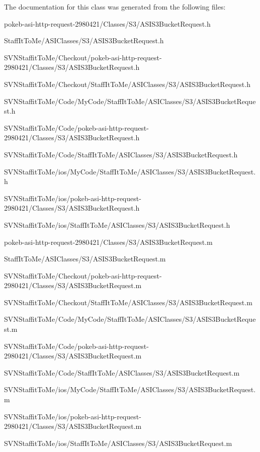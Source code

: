 \-The documentation for this class was generated from the following files\-:\begin{DoxyCompactItemize}
\item 
pokeb-\/asi-\/http-\/request-\/2980421/\-Classes/\-S3/\-A\-S\-I\-S3\-Bucket\-Request.\-h\item 
\-Staff\-It\-To\-Me/\-A\-S\-I\-Classes/\-S3/\-A\-S\-I\-S3\-Bucket\-Request.\-h\item 
\-S\-V\-N\-Staffit\-To\-Me/\-Checkout/pokeb-\/asi-\/http-\/request-\/2980421/\-Classes/\-S3/\-A\-S\-I\-S3\-Bucket\-Request.\-h\item 
\-S\-V\-N\-Staffit\-To\-Me/\-Checkout/\-Staff\-It\-To\-Me/\-A\-S\-I\-Classes/\-S3/\-A\-S\-I\-S3\-Bucket\-Request.\-h\item 
\-S\-V\-N\-Staffit\-To\-Me/\-Code/\-My\-Code/\-Staff\-It\-To\-Me/\-A\-S\-I\-Classes/\-S3/\-A\-S\-I\-S3\-Bucket\-Request.\-h\item 
\-S\-V\-N\-Staffit\-To\-Me/\-Code/pokeb-\/asi-\/http-\/request-\/2980421/\-Classes/\-S3/\-A\-S\-I\-S3\-Bucket\-Request.\-h\item 
\-S\-V\-N\-Staffit\-To\-Me/\-Code/\-Staff\-It\-To\-Me/\-A\-S\-I\-Classes/\-S3/\-A\-S\-I\-S3\-Bucket\-Request.\-h\item 
\-S\-V\-N\-Staffit\-To\-Me/ios/\-My\-Code/\-Staff\-It\-To\-Me/\-A\-S\-I\-Classes/\-S3/\-A\-S\-I\-S3\-Bucket\-Request.\-h\item 
\-S\-V\-N\-Staffit\-To\-Me/ios/pokeb-\/asi-\/http-\/request-\/2980421/\-Classes/\-S3/\-A\-S\-I\-S3\-Bucket\-Request.\-h\item 
\-S\-V\-N\-Staffit\-To\-Me/ios/\-Staff\-It\-To\-Me/\-A\-S\-I\-Classes/\-S3/\-A\-S\-I\-S3\-Bucket\-Request.\-h\item 
pokeb-\/asi-\/http-\/request-\/2980421/\-Classes/\-S3/\-A\-S\-I\-S3\-Bucket\-Request.\-m\item 
\-Staff\-It\-To\-Me/\-A\-S\-I\-Classes/\-S3/\-A\-S\-I\-S3\-Bucket\-Request.\-m\item 
\-S\-V\-N\-Staffit\-To\-Me/\-Checkout/pokeb-\/asi-\/http-\/request-\/2980421/\-Classes/\-S3/\-A\-S\-I\-S3\-Bucket\-Request.\-m\item 
\-S\-V\-N\-Staffit\-To\-Me/\-Checkout/\-Staff\-It\-To\-Me/\-A\-S\-I\-Classes/\-S3/\-A\-S\-I\-S3\-Bucket\-Request.\-m\item 
\-S\-V\-N\-Staffit\-To\-Me/\-Code/\-My\-Code/\-Staff\-It\-To\-Me/\-A\-S\-I\-Classes/\-S3/\-A\-S\-I\-S3\-Bucket\-Request.\-m\item 
\-S\-V\-N\-Staffit\-To\-Me/\-Code/pokeb-\/asi-\/http-\/request-\/2980421/\-Classes/\-S3/\-A\-S\-I\-S3\-Bucket\-Request.\-m\item 
\-S\-V\-N\-Staffit\-To\-Me/\-Code/\-Staff\-It\-To\-Me/\-A\-S\-I\-Classes/\-S3/\-A\-S\-I\-S3\-Bucket\-Request.\-m\item 
\-S\-V\-N\-Staffit\-To\-Me/ios/\-My\-Code/\-Staff\-It\-To\-Me/\-A\-S\-I\-Classes/\-S3/\-A\-S\-I\-S3\-Bucket\-Request.\-m\item 
\-S\-V\-N\-Staffit\-To\-Me/ios/pokeb-\/asi-\/http-\/request-\/2980421/\-Classes/\-S3/\-A\-S\-I\-S3\-Bucket\-Request.\-m\item 
\-S\-V\-N\-Staffit\-To\-Me/ios/\-Staff\-It\-To\-Me/\-A\-S\-I\-Classes/\-S3/\-A\-S\-I\-S3\-Bucket\-Request.\-m\end{DoxyCompactItemize}
